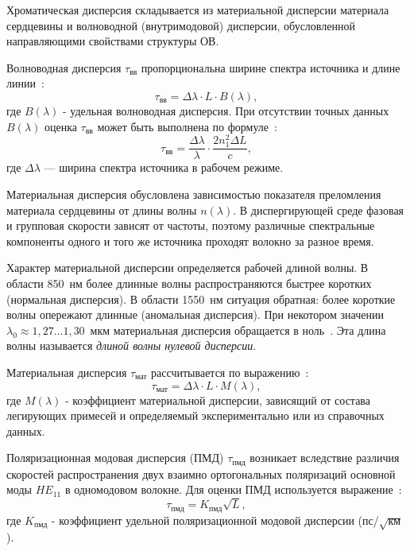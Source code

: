 Хроматическая дисперсия складывается из материальной дисперсии материала сердцевины и волноводной (внутримодовой) дисперсии, обусловленной направляющими свойствами структуры ОВ.

Волноводная дисперсия $\tau_\text{вв}$ пропорциональна ширине спектра источника и длине линии~\cite{volokonno2012}:
\begin{equation}
    \tau_\text{вв} = \Delta\lambda \cdot L \cdot B(\lambda),
\end{equation}
где $B(\lambda)$ - удельная волноводная дисперсия. При отсутствии точных данных $B(\lambda)$ оценка $\tau_\text{вв}$ может быть выполнена по формуле~\cite{volokonno2012}:
\begin{equation}
    \tau_\text{вв} = \frac{\Delta\lambda}{\lambda} \cdot \frac{2 n_1^2 \Delta L}{c},
\end{equation}
где $\Delta\lambda$ --- ширина спектра источника в рабочем режиме.


Материальная дисперсия обусловлена зависимостью показателя преломления материала сердцевины от длины волны $n(\lambda)$. В диспергирующей среде фазовая и групповая скорости зависят от частоты, поэтому различные спектральные компоненты одного и того же источника проходят волокно за разное время.

Характер материальной дисперсии определяется рабочей длиной волны. В области 850~нм более длинные волны распространяются быстрее коротких (нормальная дисперсия). В области 1550~нм ситуация обратная: более короткие волны опережают длинные (аномальная дисперсия). При некотором значении $\lambda_0 \approx 1{,}27 \dots 1{,}30$~мкм материальная дисперсия обращается в ноль~\cite{volokonno2012}. Эта длина волны называется \textit{длиной волны нулевой дисперсии}.

Материальная дисперсия $\tau_\text{мат}$ рассчитывается по выражению~\cite{volokonno2012}:
\begin{equation}
    \tau_\text{мат} = \Delta\lambda \cdot L \cdot M(\lambda),
\end{equation}
где $M(\lambda)$ - коэффициент материальной дисперсии, зависящий от состава легирующих примесей и определяемый экспериментально или из справочных данных.


Поляризационная модовая дисперсия (ПМД) $\tau_\text{пмд}$ возникает вследствие различия скоростей распространения двух взаимно ортогональных поляризаций основной моды $HE_{11}$ в одномодовом волокне. Для оценки ПМД используется выражение~\cite{volokonno2012}:
\begin{equation}
    \tau_\text{пмд} = K_\text{пмд} \sqrt{L},
\end{equation}
где $K_\text{пмд}$ - коэффициент удельной поляризационной модовой дисперсии (пс/$\sqrt{\text{км}}$).

